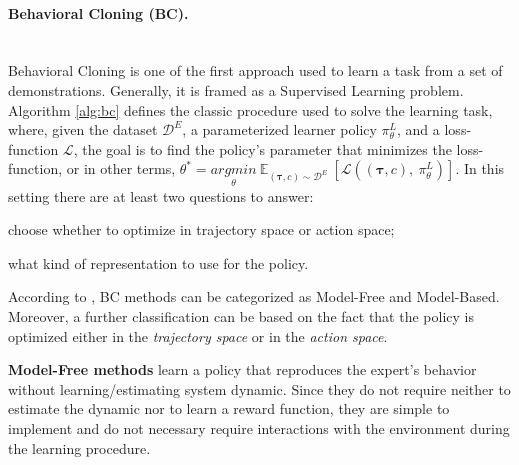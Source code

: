 \paragraph{Behavioral Cloning (BC).} \mbox{} \\
Behavioral Cloning is one of the first approach used to learn a task from a set of demonstrations. Generally, it is framed as a Supervised Learning problem. Algorithm \ref{alg:bc} defines the classic procedure used to solve the learning task, where, given the dataset $\mathcal{D}^{E}$, a parameterized learner policy $\pi^{L}_{\theta}$, and a loss-function $\mathcal{L}$, the goal is to find the policy's parameter that minimizes the loss-function, or in other terms, $\theta^{*} = \underset{\theta}{argmin} \ \mathbb{E}_{(\boldsymbol{\tau}, c) \sim \mathcal{D}^{E}} \ [\mathcal{L}((\boldsymbol{\tau}, c), \ \pi^{L}_{\theta})]$.
In this setting there are at least two questions to answer:
\begin{enumerate*}[label=\textbf{(\arabic*)}]
    \item choose whether to optimize in trajectory space or action space;
    \item what kind of representation to use for the policy.
\end{enumerate*}
\newline According to \cite{osa2018algorithmic}, BC methods can be categorized as Model-Free and Model-Based. Moreover, a further classification can be based on the fact that the policy is optimized either in the \textit{trajectory space} or in the \textit{action space}.


\textbf{Model-Free methods} learn a policy that reproduces the expert's behavior without learning/estimating system dynamic. Since they do not require neither to estimate the dynamic nor to learn a reward function, they are simple to implement and do not necessary require interactions with the environment during the learning procedure.

